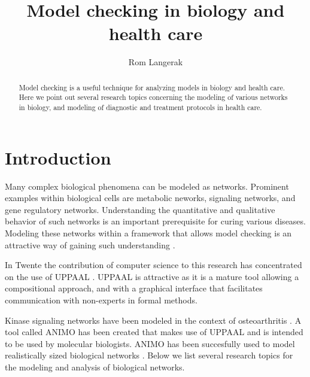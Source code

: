 \documentclass[sigplan,10pt]{acmart}\settopmatter{printfolios=true,printccs=false,printacmref=false}
\begin{document}
\title[]{Model checking in biology and health care} 


\author{Rom Langerak}


\begin{abstract}

Model checking is a useful technique for analyzing models in biology and
health care.
Here we point out several research topics concerning the modeling of
various networks in biology, and modeling
of diagnostic and treatment protocols in health care.

\end{abstract}


\maketitle


\section{Introduction}
Many complex biological phenomena can be modeled as networks. Prominent
examples within biological cells are metabolic neworks, signaling networks, and
gene regulatory networks. Understanding the quantitative and qualitative
behavior of such networks is an important prerequisite for curing various
diseases. Modeling these networks within a framework that allows model checking
is an attractive way of gaining such understanding \cite{Brim:2013aa,David2015}.

In Twente the contribution of computer science to this research has
concentrated on the use of
UPPAAL \cite{UPPAAL:aa}. UPPAAL is attractive as it is a mature tool allowing
a compositional approach, and with a graphical interface that facilitates
communication with non-experts in formal methods.

Kinase signaling networks have been modeled 
in the context of osteoarthritis \cite{Scholma:2013aa,Scholma:2014aa}. A tool
called ANIMO has been created \cite{ANIMO:aa} that makes use of UPPAAL and is
intended to be used by molecular biologists. ANIMO has been succesfully used to
model realistically sized biological networks 
\cite{Schivo:2012aa,Schivo:2013ab,Schivo:2014aa,Scholma:2014ab,Schivo:2016aa}.
Below we list several research topics for the modeling and analysis of
biological networks.
\end{document}
